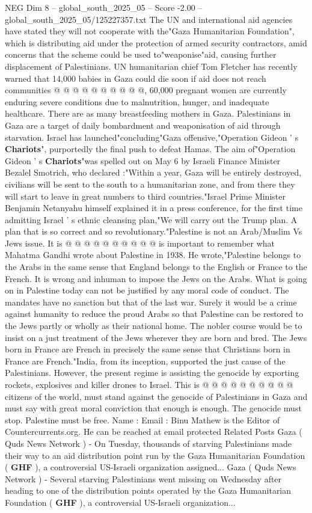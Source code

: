 \begin{textsample}{NEG Dim 8 – global\_south\_2025\_05 – Score -2.00 – global\_south\_2025\_05/125227357.txt}
The UN and international aid agencies have stated they will not cooperate with the"Gaza Humanitarian Foundation", which is distributing aid under the protection of armed security contractors, amid concerns that the scheme could be used to"weaponise"aid, causing further displacement of Palestinians.
UN humanitarian chief Tom Fletcher has recently warned that 14,000 babies in Gaza could die soon if aid does not reach communities @ @ @ @ @ @ @ @ @ @, 60,000 pregnant women are currently enduring severe conditions due to malnutrition, hunger, and inadequate healthcare.
There are as many breastfeeding mothers in Gaza.
Palestinians in Gaza are a target of daily bombardment and weaponisation of aid through starvation.
Israel has launched"concluding"Gaza offensive,"Operation Gideon ' s \textbf{Chariots}", purportedly the final push to defeat Hamas.
The aim of"Operation Gideon ' s \textbf{Chariots}"was spelled out on May 6 by Israeli Finance Minister Bezalel Smotrich, who declared :"Within a year, Gaza will be entirely destroyed, civilians will be sent to the south to a humanitarian zone, and from there they will start to leave in great numbers to third countries."Israel Prime Minister Benjamin Netanyahu himself explained it in a press conference, for the first time admitting Israel ' s ethnic cleansing plan,"We will carry out the Trump plan.
A plan that is so correct and so revolutionary."Palestine is not an Arab/Muslim Vs Jews issue.
It is @ @ @ @ @ @ @ @ @ @ is important to remember what Mahatma Gandhi wrote about Palestine in 1938.
He wrote,"Palestine belongs to the Arabs in the same sense that England belongs to the English or France to the French.
It is wrong and inhuman to impose the Jews on the Arabs.
What is going on in Palestine today can not be justified by any moral code of conduct.
The mandates have no sanction but that of the last war.
Surely it would be a crime against humanity to reduce the proud Arabs so that Palestine can be restored to the Jews partly or wholly as their national home.
The nobler course would be to insist on a just treatment of the Jews wherever they are born and bred.
The Jews born in France are French in precisely the same sense that Christians born in France are French."India, from its inception, supported the just cause of the Palestinians.
However, the present regime is assisting the genocide by exporting rockets, explosives and killer drones to Israel.
This is @ @ @ @ @ @ @ @ @ @ citizens of the world, must stand against the genocide of Palestinians in Gaza and must say with great moral conviction that enough is enough.
The genocide must stop.
Palestine must be free.
Name : Email : Binu Mathew is the Editor of Countercurrents.org.
He can be reached at email protected Related Posts Gaza ( Quds News Network ) - On Tuesday, thousands of starving Palestinians made their way to an aid distribution point run by the Gaza Humanitarian Foundation ( \textbf{GHF} ), a controversial US-Israeli organization assigned...
Gaza ( Quds News Network ) - Several starving Palestinians went missing on Wednesday after heading to one of the distribution points operated by the Gaza Humanitarian Foundation ( \textbf{GHF} ), a controversial US-Israeli organization...


\end{textsample}
